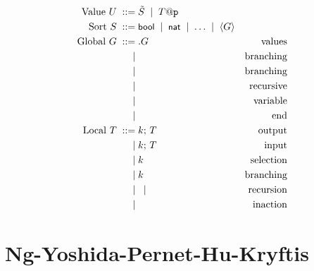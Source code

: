 \documentclass{article}
\begin{document}
\begin{align*}
  \text{Value}\ U
    \grmeq & \VEC{S} \grmor T@\participant{p} \\
  \text{Sort}\ S
  \grmeq & \keyword{bool} \grmor \keyword{nat} \grmor \dots \grmor \langle G\rangle\\
  \text{Global}\ G
    \grmeq & \gsendType p{p'}{k}UG   & \text{values}\\
    \grmor & \gbranchType p{p'}{k}lG & \text{branching}\\
    \grmor & \gparType G{G'}         & \text{branching}\\
    \grmor & \grecurType tG          & \text{recursive}\\
    \grmor & \grecvarType t          & \text{variable}\\
    \grmor & \gendType               & \text{end}\\
  \text{Local}\ T
    \grmeq & \sendType[k] UT   & \text{output}\\
    \grmor & \recvType[k] UT   & \text{input}\\
    \grmor & \selectType[k] lT & \text{selection}\\
    \grmor & \branchType[k] lT & \text{branching}\\
    \grmor & \recurType tT \grmor \recvarType t
                               & \text{recursion}\\
    \grmor & \EndType          & \text{inaction}\\
\end{align*}

\section{Ng-Yoshida-Pernet-Hu-Kryftis}
\end{document}
